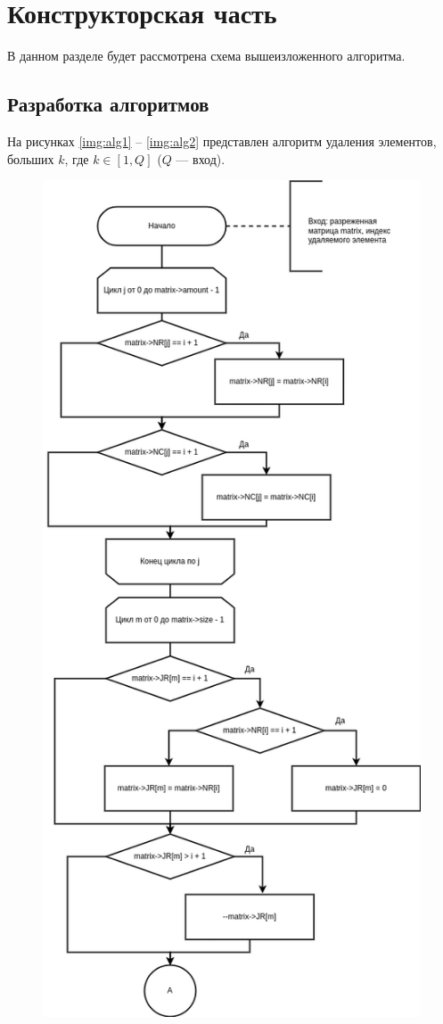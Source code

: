 \chapter{Конструкторская часть}

В данном разделе будет рассмотрена схема вышеизложенного алгоритма.

\section{Разработка алгоритмов}

На рисунках \ref{img:alg1} -- \ref{img:alg2} представлен алгоритм удаления элементов, больших $k$, где $k\in [1,Q]$ ($Q$ --- вход).

\begin{figure}[H]
	\begin{center}
		\includegraphics[scale=0.51]{img/alg1.png}

\end{center}
\end{figure}
